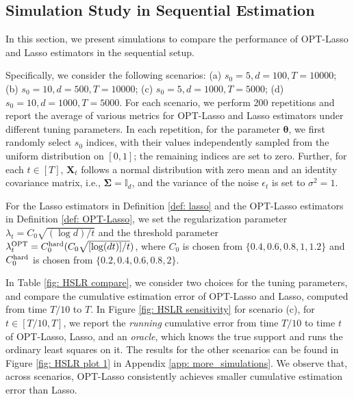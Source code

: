 \documentclass[aos,preprint]{imsart}
\theoremstyle{plain}
\theoremstyle{definition}
\newcommand{\btheta}{\boldsymbol{\theta}}
\newcommand{\bX}{\boldsymbol{X}}
\newcommand{\bSigma}{\boldsymbol{\Sigma}}
\newcommand{\hdlambda}{\lambda^{\textup{OPT}}}
\begin{document}
\subsection{Simulation Study in Sequential Estimation} \label{sec: HSLR simulation}
In this section, we present simulations to compare the performance of OPT-Lasso and Lasso estimators in the sequential setup. 

Specifically, we consider the following scenarios: (a) $s_0=5, d=100, T=10000$; (b) $s_0=10, d=500, T=10000$; (c) $s_0=5,d=1000, T=5000$; (d) $s_0=10,d=1000, T=5000$.  For each scenario, we perform 200 repetitions and report the average of various metrics for OPT-Lasso and Lasso estimators under different tuning parameters. In each repetition, for the parameter $\btheta$, we first randomly select $s_0$ indices, with their values independently sampled from the uniform distribution on $[0,1]$; the remaining indices are set to zero. Further, for each $t \in [T]$, $\bX_t$ follows a normal distribution with zero mean and an identity covariance matrix, i.e., $\bSigma=\mathbb{I}_d$, and the variance of the noise $\epsilon_t$ is set to $\sigma^2 = 1$.

For the Lasso estimators in Definition \ref{def: lasso} and the OPT-Lasso estimators in Definition \ref{def: OPT-Lasso}, we set the regularization parameter $\lambda_t = C_0\sqrt{(\log d)/t}$ and the threshold parameter $\hdlambda_t=C_0^{\textup{hard}}(C_0\sqrt{[\log (dt)]/t})$, where $C_0$ is chosen from $\{0.4,0.6,0.8,1,1.2\}$ and $C_0^{\textup{hard}}$ is chosen from $\{0.2,0.4,0.6,0.8,2\}$.


In Table \ref{fig: HSLR compare}, we consider two choices for the tuning parameters, and compare the cumulative estimation error of OPT-Lasso and Lasso, computed from time $T/10$ to $T$.  In Figure \ref{fig: HSLR sensitivity} for scenario (c), for $t \in [T/10,T]$, we report the \textit{running} cumulative error from time $T/10$ to time $t$ of OPT-Lasso, Lasso, and an \textit{oracle}, which knows the true support and runs the ordinary least squares on it. The results for the other scenarios can be found in Figure \ref{fig: HSLR plot 1} in Appendix \ref{app: more_simulations}. We observe that, across scenarios, OPT-Lasso consistently achieves smaller cumulative estimation error than Lasso.
\end{document}

